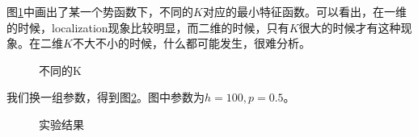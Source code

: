 \documentclass[12pt,a4paper]{article}
\begin{document}
图\ref{bk}中画出了某一个势函数下，不同的$K$对应的最小特征函数。可以看出，在一维的时候，localization现象比较明显，而二维的时候，只有$K$很大的时候才有这种现象。在二维$K$不大不小的时候，什么都可能发生，很难分析。
\begin{figure}[h]
\centering
{}
\caption{不同的K}
\label{bk}
\end{figure}

我们换一组参数，得到图\ref{fk2}。图中参数为$h=100, p=0.5$。
\begin{figure}[h]
\centering
{}
\caption{实验结果}
\label{fk2}
\end{figure}
\end{document}
